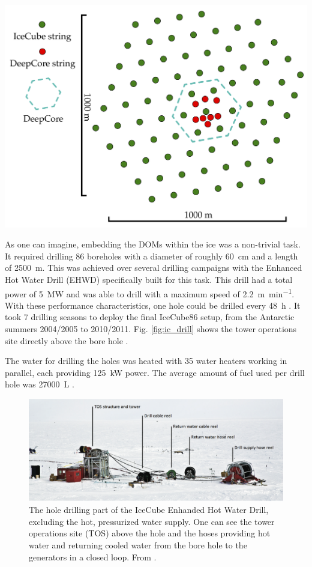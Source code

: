 \documentclass[
    a4paper, %
    fontsize=10pt, %
    twoside=true, %
    numbers=noenddot, %
    fontmethod=tex, %
]{kaobook}
\begin{document}
\begin{marginfigure}
    \includegraphics{ic_top_view.pdf}
    \caption[IceCube top-down view]{Top-down view of the IceCube detector, spanning \SI{1}{\square\km} on the surface. Adopted from \cite{Ahlers2018a}.}
\end{marginfigure}
As one can imagine, embedding the DOMs within the ice was a non-trivial task. It required drilling 86 boreholes with a diameter of roughly \SI{60}{\cm} and a length of \SI{2500}{\m}. This was achieved over several drilling campaigns with the Enhanced Hot Water Drill (EHWD) specifically built for this task. This drill had a total power of \SI{5}{\mega\W} and was able to drill with a maximum speed of \SI{2.2}{\meter\per\minute}. With these performance characteristics, one hole could be drilled every \SI{48}{\hour} \cite{Aartsen2017}. It took 7 drilling seasons to deploy the final IceCube86 setup, from the Antarctic summers 2004/2005 to 2010/2011. Fig. \ref{fig:ic_drill} shows the tower operations site directly above the bore hole .

The water for drilling the holes was heated with 35 water heaters working in parallel, each providing \SI{125}{\kilo\W} power. The average amount of fuel used per drill hole was \SI{27000}{\liter} \cite{Benson2014}.

\begin{figure}[]
    \includegraphics{ic_drill.png}
    \caption[IceCube drill]{The hole drilling part of the IceCube Enhanded Hot Water Drill, excluding the hot, pressurized water supply. One can see the tower operations site (TOS) above the hole and the hoses providing hot water and returning cooled water from the bore hole to the generators in a closed loop. From \cite{Benson2014}.}
\end{figure}
\end{document}
